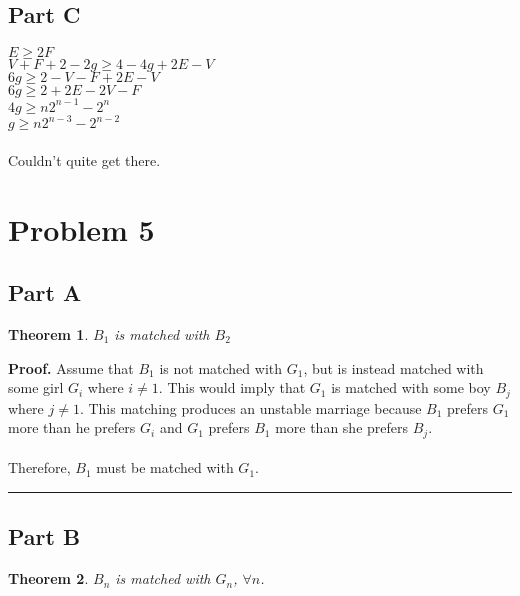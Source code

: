 \documentclass{article}%
\newtheorem{theorem}{Theorem}
\newenvironment{proof}[1][Proof]{\noindent\textbf{#1.} }{\ \rule{0.5em}{0.5em}}
\begin{document}
\subsection{Part C}

$E \geq 2F$ \\
$V + F + 2 -2g \geq 4 - 4g + 2E - V$ \\
$6g \geq 2 - V - F + 2E - V$ \\
$6g \geq 2 + 2E - 2V - F$ \\
$4g \geq n2^{n-1} - 2^n$ \\
$g \geq n2^{n-3} - 2^{n-2}$ \\ \\
Couldn't quite get there.

\section{Problem 5}
\subsection{Part A}
\begin{theorem}
$B_1$ is matched with $B_2$
\end{theorem}

\begin{proof}
    Assume that $B_1$ is not matched with $G_1$, but is instead matched with some girl $G_i$ where $i \neq 1$. This would imply that $G_1$ is matched with some boy $B_j$ where $j \neq 1$. This matching produces an unstable marriage because $B_1$ prefers $G_1$ more than he prefers $G_i$ and $G_1$ prefers $B_1$ more than she prefers $B_j$. \\ \\
    Therefore, $B_1$ must be matched with $G_1$.
\end{proof}

\subsection{Part B}
\begin{theorem}
$B_n$ is matched with $G_n$, $\forall n$.
\end{theorem}
\end{document}
